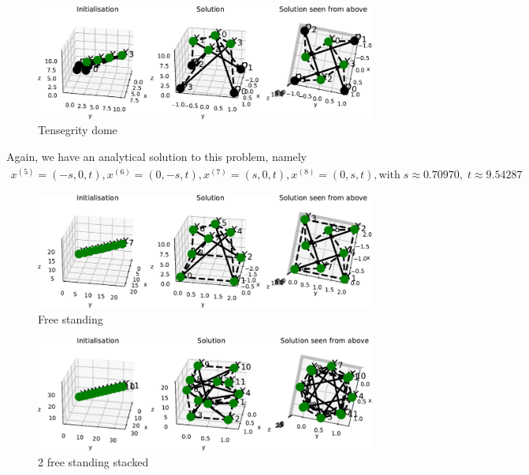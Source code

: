 \begin{figure}
    \centering
    \includegraphics[width=1\columnwidth]{Bilder/P69.pdf}
    \caption{Tensegrity dome}
    \label{P69}
\end{figure}
Again, we have an analytical solution to this problem, namely 
\begin{equation*}
    \begin{gathered}
    x^{(5)} = (-s,0,t),x^{(6)} = (0,-s,t),x^{(7)} = (s,0,t),x^{(8)} = (0,s,t),  \text{with}\; s \approx 0.70970, \; t \approx 9.54287
    \end{gathered}
\end{equation*}

\begin{figure}
    \centering
    \includegraphics[width=0.95\columnwidth]{Bilder/FREESTANDING.pdf}
    \caption{Free standing}
    \label{fig:freestanding}
\end{figure}

\begin{figure}[!ht]
    \centering
\includegraphics[width=0.95\columnwidth]{Bilder/2FREESTANDING.pdf}
    \caption{2 free standing stacked}
    \label{fig:2freestanding}
\end{figure}


